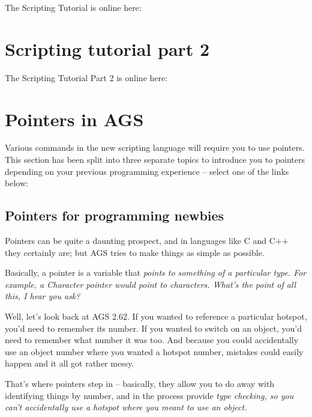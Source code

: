 The Scripting Tutorial is online here:

\section{Scripting tutorial part 2}%

The Scripting Tutorial Part 2 is online here:


\section{Pointers in AGS}\label{Pointers}%

Various commands in the new scripting language will require you to use pointers.
This section has been split into three separate topics to introduce you
to pointers depending on your previous programming experience -- select one of the
links below:

\subsection{Pointers for programming newbies}\label{PointersForNewbies}%

Pointers can be quite a daunting prospect, and in languages like C and C++ they certainly
are; but AGS tries to make things as simple as possible.

Basically, a pointer is a variable that \it{points} to something of a particular type.
For example, a \it{Character} pointer would point to characters. What's the point of
all this, I hear you ask?

Well, let's look back at AGS 2.62. If you wanted to reference a particular hotspot,
you'd need to remember its number. If you wanted to switch on an object, you'd need to
remember what number it was too. And because you could accidentally use an object
number where you wanted a hotspot number, mistakes could easily happen and it all got
rather messy.

That's where pointers step in -- basically, they allow you to do away with identifying
things by number, and in the process provide \it{type checking}, so you can't accidentally
use a hotspot where you meant to use an object.

